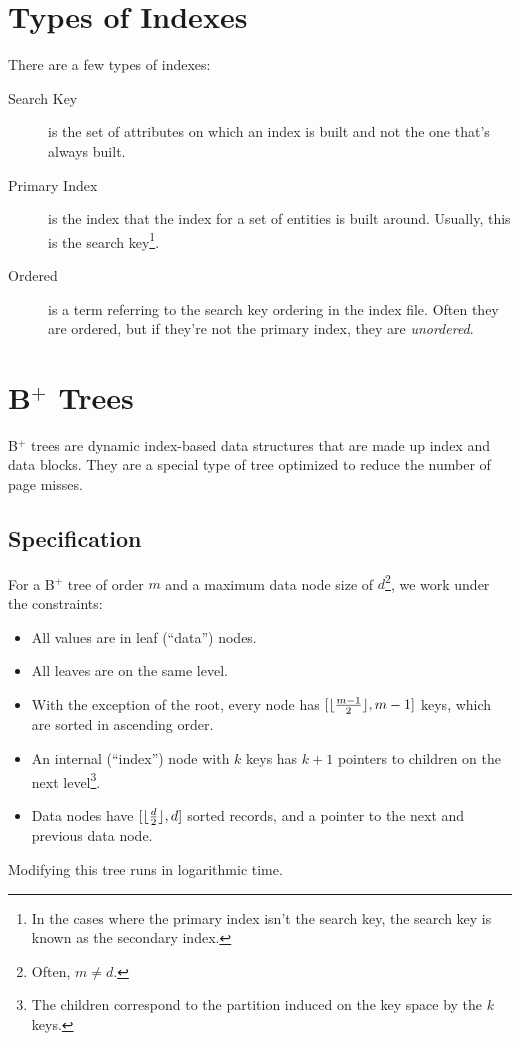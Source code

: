             \section{Types of Indexes} %
            \label{sec:types_of_indices}
                There are a few types of indexes:
                \begin{description}
                    \item[Search Key] is the set of attributes on which an index is built and not the one that's always built.
                    \item[Primary Index] is the index that the index for a set of entities is built around.
                    Usually, this is the search key\footnote{In the cases where the primary index isn't the search key, the search key is known as the secondary index.}.
                    \item[Ordered] is a term referring to the search key ordering in the index file.
                    Often they are ordered, but if they're not the primary index, they are \textit{unordered}.
                \end{description}
            \section{B$^+$ Trees} %
            \label{sec:b_trees}
                B$^+$ trees are dynamic index-based data structures that are made up index and data blocks.
                They are a special type of tree optimized to reduce the number of page misses.
                \subsection{Specification} %
                \label{sub:specification}
                    For a B$^+$ tree of order $m$ and a maximum data node size of $d$\footnote{Often, $m \ne d$.}, we work under the constraints:
                    \begin{itemize}
                        \item All values are in leaf (``data'') nodes.
                        \item All leaves are on the same level.
                        \item With the exception of the root, every node has $[\lfloor\frac{m-1}{2}\rfloor, m-1]$ keys, which are sorted in ascending order.
                        \item An internal (``index'') node with $k$ keys has $k+1$ pointers to children on the next level\footnote{The children correspond to the partition induced on the key space by the $k$ keys.}.
                        \item Data nodes have $[\lfloor\frac{d}{2}\rfloor, d]$ sorted records, and a pointer to the next and previous data node.
                    \end{itemize}
				Modifying this tree runs in logarithmic time.

